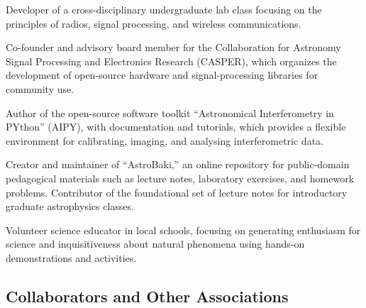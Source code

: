 \documentclass[apjpt4]{aastex}
\begin{document}
Developer of a cross-disciplinary undergraduate lab class focusing on the principles of radios, 
signal processing, and wireless communications.

Co-founder and advisory board member for the Collaboration for Astronomy
Signal Processing and Electronics Research (CASPER), which organizes the
development of open-source hardware and signal-processing libraries for community use.

Author of the open-source software toolkit ``Astronomical Interferometry in
PYthon'' (AIPY), with documentation and tutorials, which
provides a flexible environment for calibrating, imaging, and analysing interferometric data.

Creator and maintainer of ``AstroBaki,'' an online repository for public-domain
pedagogical materials such as lecture notes, laboratory
exercises, and homework problems.  Contributor of the foundational
set of lecture notes for introductory graduate astrophysics classes.

Volunteer science educator in local schools, focusing
on generating enthusiasm for science and inquisitiveness about natural
phenomena using hands-on demonstrations and activities.

\subsection*{Collaborators and Other Associations}
\vspace{-8pt}

%
%
%
\end{document}
